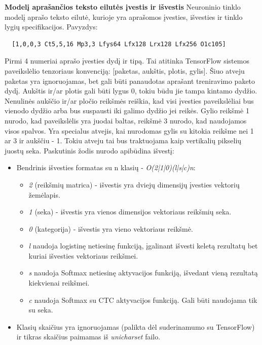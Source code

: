 \documentclass{VUMIFInfBakalaurinis}
\begin{document}
\textbf{Modelį aprašančios teksto eilutės įvestis ir išvestis}
Neuroninio tinklo modelį aprašo teksto eilutė, kurioje yra aprašomos įvesties, išvesties ir tinklo lygių specifikacijos. 
Pavyzdys: 

\begin{verbatim}
  [1,0,0,3 Ct5,5,16 Mp3,3 Lfys64 Lfx128 Lrx128 Lfx256 O1c105]
\end{verbatim}

Pirmi 4 numeriai aprašo įvesties dydį ir tipą. Tai atitinka TensorFlow sistemos paveikslėlio tenzoriaus konvenciją: [paketas, aukštis, plotis, gylis].
Šiuo atveju paketas yra ignoruojamas, bet gali būti panaudotas aprašant treniravimo paketo dydį.
Aukštis ir/ar plotis gali būti lygus 0, tokiu būdu jie tampa kintamo dydžio.
Nenulinės aukščio ir/ar pločio reikšmės reiškia, kad visi įvesties paveikslėliai bus vienodo dydžio arba bus suspausti iki galimo dydžio jei reikės.
Gylio reikšmė 1 nurodo, kad paveikslėlis yra juodai baltas, reikšmė 3 nurodo, kad naudojamos visos spalvos.
Yra specialus atvejis, kai nurodomas gylis su kitokia reikšme nei 1 ar 3 ir aukščiu - 1. Tokiu atveju tai bus traktuojama kaip vertikalių pikselių juostų seka.
Paskutinis žodis nurodo apibūdina išvestį:

\begin{itemize}
  \item Bendrinis išvesties formatas su n klasių - \textit{O(2|1|0)(l|s|c)n}:
  \begin{itemize}
    \item \textit{2} (reikšmių matrica) - išvestis yra dviejų dimensijų įvesties vektorių žemėlapis.
    \item \textit{1} (seka) - išvestis yra vienos dimensijos vektoriaus reikšmių seka.
    \item \textit{0} (kategorija) - išvestis yra vieno vektoriaus reikšmė.
    \item \textit{l} naudoja logistinę netiesinę funkciją, įgalinant išvesti keletą rezultatų bet kuriai išvesties vektoriaus reikšmei.
    \item \textit{s} naudoja Softmax netiesinę aktyvacijos funkciją, išvedant vieną rezultatą kiekvienai reikšmei.
    \item \textit{c} naudoja Softmax su CTC aktyvacijos funkciją. Gali būti naudojama tik su seka.
  \end{itemize}
  \item Klasių skaičius yra ignoruojamas (palikta dėl suderinamumo su TensorFlow) ir tikras skaičius paimamas iš \textit{unicharset} failo.
\end{itemize}
\end{document}
